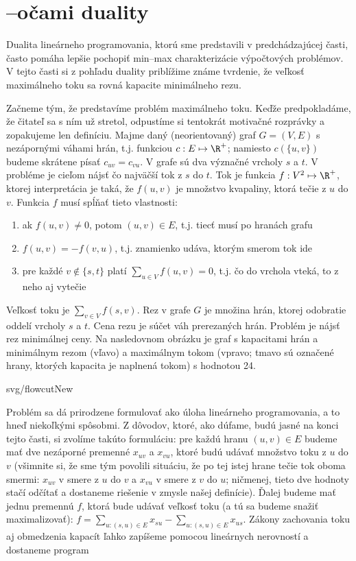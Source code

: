 \section{\maxflow--\mincut očami duality}

\noindent Dualita lineárneho programovania, ktorú sme predstavili v
predchádzajúcej časti, často pomáha lepšie pochopiť min--max charakterizácie
výpočtových problémov.  V tejto časti si z pohľadu duality priblížime známe
tvrdenie, že veľkosť maximálneho toku sa rovná kapacite minimálneho rezu.


\noindent
Začneme tým, že predstavíme problém maximálneho toku. Keďže predpokladáme, že čitateľ
sa s ním už stretol, odpustíme si tentokrát motivačné rozprávky a zopakujeme len definíciu. 
Majme daný (neorientovaný) graf $G=(V,E)$ s nezápornými váhami hrán, t.j. 
funkciou $c:E\mapsto\R^+$; namiesto $c(\{u,v\})$ budeme skrátene písať $c_{uv}=c_{vu}$.
V grafe sú dva význačné vrcholy $s$ a $t$.
V probléme \maxflow je cieľom nájsť čo najväčší tok z $s$ do $t$. Tok je funkcia 
$f:V^2\mapsto\R^+$, ktorej interpretácia je taká, že $f(u,v)$ je množstvo kvapaliny, ktorá tečie
z $u$ do $v$. Funkcia $f$ musí spĺňať tieto vlastnosti:
\begin{enumerate}
  \item ak $f(u,v)\not=0$, potom $(u,v)\in E$, t.j. tiecť musí po hranách grafu
  \item $f(u,v)=-f(v,u)$, t.j. znamienko udáva, ktorým smerom tok ide
  \item pre každé $v\not\in\{s,t\}$ platí $\sum\limits_{u\in V}f(u,v)=0$, t.j. čo do vrchola vteká, to z neho aj vytečie
\end{enumerate}
\noindent
Veľkosť toku je $\sum_{v\in V}f(s,v)$. Rez v grafe $G$ je množina hrán, ktorej odobratie oddelí vrcholy $s$ a $t$.
Cena rezu je súčet váh prerezaných hrán. Problém \mincut je nájsť rez minimálnej ceny. 
Na nasledovnom obrázku je graf s kapacitami hrán a minimálnym rezom (vľavo) a maximálnym tokom 
(vpravo; tmavo sú označené hrany, ktorých kapacita je naplnená tokom) s hodnotou 24.


\begin{myfig}{\textwidth}{svg/flowcutNew}
\end{myfig}


\noindent
Problém \maxflow sa dá prirodzene formulovať ako úloha lineárneho programovania, a to hneď niekoľkými
spôsobmi. Z dôvodov, ktoré, ako dúfame, budú jasné na konci tejto časti, si zvolíme takúto 
formuláciu: pre každú hranu $(u,v)\in E$ budeme mať dve nezáporné premenné $x_{uv}$ a $x_{vu}$, 
ktoré budú udávať množstvo toku z $u$ do $v$ (všimnite si, že sme tým povolili situáciu, 
že po tej istej hrane tečie tok oboma smermi: $x_{uv}$ v smere z $u$ do $v$ a $x_{vu}$ v
smere z $v$ do $u$; ničmenej, tieto dve hodnoty stačí odčítať a dostaneme riešenie
v zmysle našej definície). Ďalej budeme mať jednu premennú $f$, ktorá bude udávať veľkosť
toku (a tú sa budeme snažiť maximalizovať): $f=\sum\limits_{u:(s,u)\in E}x_{su}-\sum\limits_{u:(s,u)\in E}x_{us}$. 
Zákony zachovania toku aj obmedzenia kapacít  
ľahko zapíšeme pomocou lineárnych nerovností a dostaneme program

